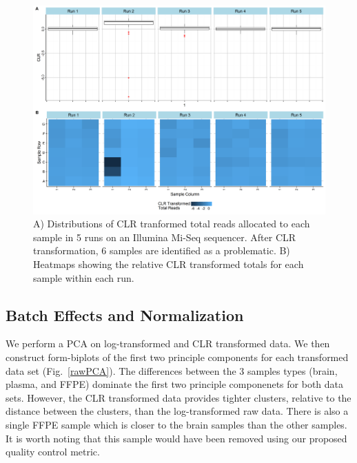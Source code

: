 \documentclass{article}\usepackage[]{graphicx}\usepackage[]{color}
\theoremstyle{definition}
\begin{document}
\begin{figure}
\includegraphics[scale=.5]{./Figures/IO_Repro_Combined_CLR}
\caption{A) Distributions of CLR tranformed total reads allocated to each sample in 5 runs on an Illumina Mi-Seq sequencer. After CLR transformation, 6 samples are identified as a problematic. B) Heatmaps showing the relative CLR transformed totals for each sample within each run.}
\label{clrFig}
\end{figure}

\subsection{Batch Effects and Normalization}

We perform a PCA on log-transformed and CLR transformed data.  We then construct form-biplots of the first two principle components for each transformed data set (Fig.~\ref{rawPCA}).  The differences between the 3 samples types (brain, plasma, and FFPE) dominate the first two principle componenets for both data sets.  However, the CLR transformed data provides tighter clusters, relative to the distance between the clusters, than the log-transformed raw data.  There is also a single FFPE sample which is closer to the brain samples than the other samples.  It is worth noting that this sample would have been removed using our proposed quality control metric.\\
\end{document}
